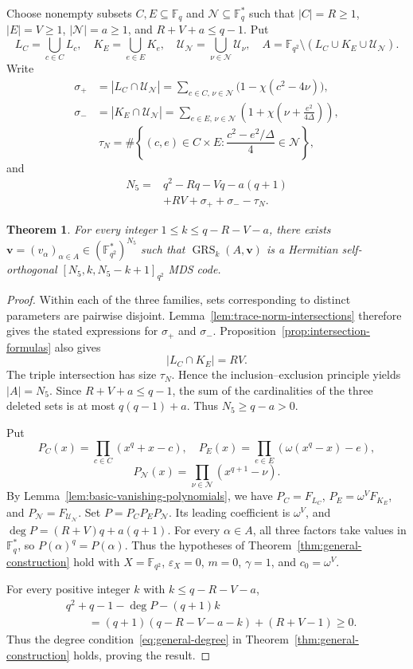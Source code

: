 \documentclass[preprint,12pt,a4paper]{elsarticle}
\newtheorem{theorem}{Theorem}[section]
\newcommand{\GRS}{\operatorname{GRS}}
\begin{document}
Choose nonempty subsets $C,E\subseteq\mathbb F_q$ and $\mathcal N\subseteq\mathbb F_q^{*}$ such that $|C|=R\ge1$, $|E|=V\ge1$, $|\mathcal N|=a\ge1$, and $R+V+a\le q-1$. Put
\[
 L_C=\bigcup_{c\in C}L_c,
 \quad
 K_E=\bigcup_{e\in E}K_e,
 \quad
 \mathcal U_{\mathcal N}=\bigcup_{\nu\in\mathcal N}\mathcal U_\nu,
 \quad
 A=\mathbb F_{q^2}\setminus(L_C\cup K_E\cup\mathcal U_{\mathcal N}).
\]
Write
\[
\begin{aligned}
 \sigma_+&=|L_C\cap\mathcal U_{\mathcal N}|
 =\sum_{c\in C,\,\nu\in\mathcal N}
 \bigl(1-\chi(c^2-4\nu)\bigr),\\
 \sigma_-&=|K_E\cap\mathcal U_{\mathcal N}|
 =\sum_{e\in E,\,\nu\in\mathcal N}
 \left(1+\chi\left(\nu+\frac{e^2}{4\Delta}\right)\right),
\end{aligned}
\]
\[
 \tau_N=\#\left\{(c,e)\in C\times E:
 \frac{c^2-e^2/\Delta}{4}\in\mathcal N\right\},
\]
and
\[
 \begin{aligned}
 N_5={}&q^2-Rq-Vq-a(q+1)\\
       &+RV+\sigma_++\sigma_- -\tau_N.
\end{aligned}
\]

\begin{theorem}\label{thm:fifth-grs}
For every integer $1\le k\le q-R-V-a$, there exists $\boldsymbol v=(v_\alpha)_{\alpha\in A}\in (\mathbb F_{q^2}^{*})^{N_5}$ such that $\GRS_k(A,\boldsymbol v)$ is a Hermitian self-orthogonal $[N_5,k,N_5-k+1]_{q^2}$ MDS code.
\end{theorem}

\begin{proof}
Within each of the three families, sets corresponding to distinct parameters are pairwise disjoint. Lemma~\ref{lem:trace-norm-intersections} therefore gives the stated expressions for $\sigma_+$ and $\sigma_-$. Proposition~\ref{prop:intersection-formulas} also gives
\[
 |L_C\cap K_E|=RV.
\]
The triple intersection has size $\tau_N$. Hence the inclusion--exclusion principle yields $|A|=N_5$. Since $R+V+a\le q-1$, the sum of the cardinalities of the three deleted sets is at most $q(q-1)+a$. Thus $N_5\ge q-a>0$.

Put
\[
 P_C(x)=\prod_{c\in C}(x^q+x-c),
 \quad
 P_E(x)=\prod_{e\in E}(\omega(x^q-x)-e),
\]
\[
 P_{\mathcal N}(x)=\prod_{\nu\in\mathcal N}(x^{q+1}-\nu).
\]
By Lemma~\ref{lem:basic-vanishing-polynomials}, we have $P_C=F_{L_C}$, $P_E=\omega^VF_{K_E}$, and $P_{\mathcal N}=F_{\mathcal U_{\mathcal N}}$. Set $P=P_CP_EP_{\mathcal N}$. Its leading coefficient is $\omega^V$, and $\deg P=(R+V)q+a(q+1)$. For every $\alpha\in A$, all three factors take values in $\mathbb F_q^{*}$, so $P(\alpha)^q=P(\alpha)$. Thus the hypotheses of Theorem~\ref{thm:general-construction} hold with $X=\mathbb F_{q^2}$, $\varepsilon_X=0$, $m=0$, $\gamma=1$, and $c_0=\omega^V$.

For every positive integer $k$ with $k\le q-R-V-a$,
\[
\begin{aligned}
 &q^2+q-1-\deg P-(q+1)k\\
 &\qquad=(q+1)(q-R-V-a-k)+(R+V-1)\ge0.
\end{aligned}
\]
Thus the degree condition~\eqref{eq:general-degree} in Theorem~\ref{thm:general-construction} holds, proving the result.
\end{proof}
\end{document}
